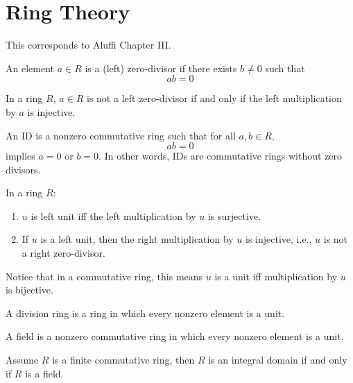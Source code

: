 \documentclass[openany]{book}
\begin{document}
\chapter{Ring Theory}
This corresponds to Aluffi Chapter III.



\begin{defn}
    An element $a\in R$ is a (left) zero-divisor if there exists $b\neq 0$ such that 
    \begin{equation*}
        ab=0
    \end{equation*}
\end{defn}

\begin{prop}
    In a ring $R$, $a\in R$ is not a left zero-divisor if and only if the left multiplication by $a$ is injective.
\end{prop}

\begin{defn}
    An ID is a nonzero commutative ring such that for all $a,b\in R$, 
    \begin{equation*}
        ab=0
    \end{equation*}
    implies $a=0$ or $b=0$. In other words, IDs are commutative rings without zero divisors.
\end{defn}

\begin{prop}
    In a ring $R$:
    \begin{enumerate}
        \item $u$ is left unit iff the left multiplication by $u$ is surjective. 
        \item If $u$ is a left unit, then the right multiplication by $u$ is injective, i.e., $u$ is not a right zero-divisor.
    \end{enumerate}
\end{prop}
Notice that in a commutative ring, this means $u$ is a unit iff multiplication by $u$ is bijective.

\begin{defn}
    A division ring is a ring in which every nonzero element is a unit.

    A field is a nonzero commutative ring in which every nonzero element is a unit.
\end{defn}


\begin{prop}
    Assume $R$ is a finite commutative ring, then $R$ is an integral domain if and only if $R$ is a field.
\end{prop}
\end{document}
